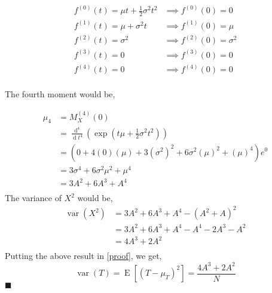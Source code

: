 \documentclass{exam}
\theoremstyle{mytheoremstyle}
\theoremstyle{mytheoremstyle}
\theoremstyle{myproblemstyle}
\begin{document}
\begin{questions}
\begin{solution}
        \begin{align*}
            f^{(0)}(t)=\mu t+\frac{1}{2}\sigma^{2}t^{2} & \implies f^{(0)}(0)= 0          \\
            f^{(1)}(t)=\mu+\sigma^{2}t                  & \implies f^{(1)}(0)= \mu        \\
            f^{(2)}(t)=\sigma^{2}                       & \implies f^{(2)}(0)= \sigma^{2} \\
            f^{(3)}(t)=0                                & \implies f^{(3)}(0)= 0          \\
            f^{(4)}(t)=0                                & \implies f^{(4)}(0)= 0          \\
        \end{align*}

        The fourth moment would be,

        \begin{equation*}
            \begin{split}
                \mu_4&=M^{(4)}_{X}(0)\\
                &=\frac{\operatorname{d}^{4}}{\operatorname{d}t^{4}}\left(\exp{\left(t\mu+\frac{1}{2}\sigma^2t^2\right)}\right)\\
                &=\left(0+4(0)(\mu)+3\left(\sigma^{2}\right)^2+6\sigma^{2}(\mu)^2+(\mu)^{4}\right)e^{0}\\
                &=3\sigma^{4}+6\sigma^{2}\mu^2+\mu^{4}\\
                &=3A^{2}+6A^3+A^{4}\\
            \end{split}
        \end{equation*}
        The variance of \(X^2\) would be,
        \begin{equation*}
            \begin{split}
                \operatorname{var}\left(X^{2}\right)&=3A^{2}+6A^3+A^{4}-\left(A^2+A\right)^2\\
                &=3A^{2}+6A^3+A^{4}-A^{4}-2A^{3}-A^{2}\\
                &=4A^{3}+2A^{2}\\
            \end{split}
        \end{equation*}
        Putting the above result in \eqref{proof}, we get,
        \[\operatorname{var}(T)=\operatorname{E}\left[\left(T-\mu_{T}\right)^{2}\right]=\frac{4A^{3}+2A^{2}}{N}\]
        \center \(\blacksquare\)
    \end{solution}


\end{questions}
\end{document}
